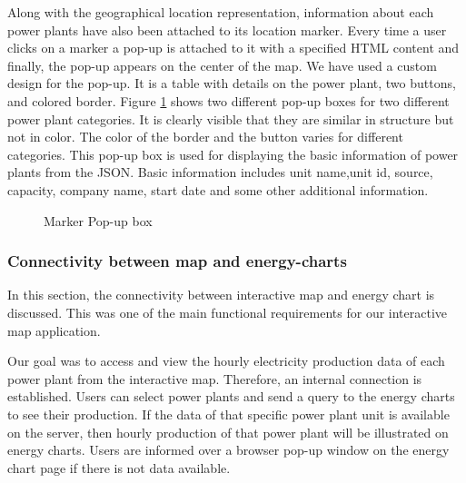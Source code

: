 Along with the geographical location representation, information about each power plants have also been attached to its location marker. Every time a user clicks on a marker a pop-up is attached to it with a specified HTML content and finally, the pop-up appears on the center of the map. We have used a custom design for the pop-up. It is a table with details on the power plant, two buttons, and colored border. Figure \ref{fig:mpp} shows two different pop-up boxes for two different power plant categories. It is clearly visible that they are similar in structure but not in color. The color of the border and the button varies for different categories. This pop-up box is used for displaying the basic information of power plants from the JSON. Basic information includes unit name,unit id, source, capacity, company name, start date and some other additional information. 


\begin{figure}
  \begin{center}
\hfill
{}
\hfill
\caption{Marker Pop-up box}
\label{fig:mpp}
\end{center}
\end{figure}

\subsubsection{Connectivity between map and energy-charts}
\label{sssec:connectivity}

In this section, the connectivity between interactive map and energy chart is discussed. This was one of the main functional requirements for our interactive map application.

Our goal was to access and view the hourly electricity production data of each power plant from the interactive map. Therefore, an internal connection is established. Users can select power plants and send a query to the energy charts to see their production. If the data of that specific power plant unit is available on the server, then hourly production of that power plant will be illustrated on energy charts. Users are informed over a browser pop-up window on the energy chart page if there is not data available.

